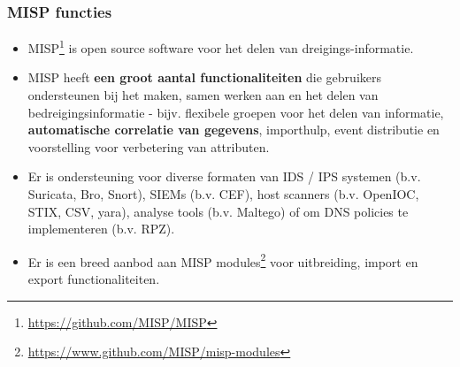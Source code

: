 
\begin{frame}
 \frametitle{MISP functies}
 \begin{itemize}
         \item MISP\footnote{\url{https://github.com/MISP/MISP}} is open source software voor het delen van dreigings-informatie.
         \item MISP heeft {\bf een groot aantal functionaliteiten} die gebruikers ondersteunen bij het maken, samen werken aan en het delen van bedreigingsinformatie - bijv. flexibele groepen voor het delen van informatie, {\bf automatische correlatie van gegevens}, importhulp, event distributie en voorstelling voor verbetering van attributen.
         \item Er is ondersteuning voor diverse formaten van IDS / IPS systemen (b.v. Suricata, Bro, Snort), SIEMs (b.v. CEF), host scanners (b.v. OpenIOC, STIX, CSV, yara), analyse tools (b.v. Maltego) of om DNS policies te implementeren (b.v. RPZ).
         \item Er is een breed aanbod aan MISP modules\footnote{\url{https://www.github.com/MISP/misp-modules}} voor uitbreiding, import en export functionaliteiten.
 \end{itemize}
\end{frame}

